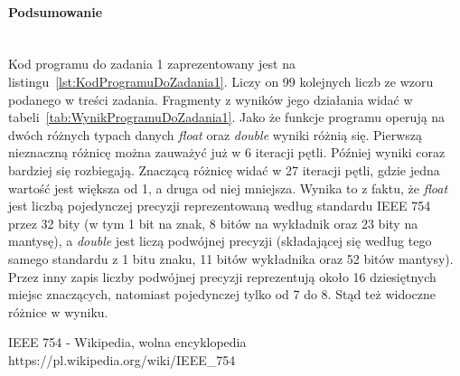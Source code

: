 \paragraph{Podsumowanie}~\\
Kod programu do zadania 1 zaprezentowany jest na listingu~\ref{lst:KodProgramuDoZadania1}.
Liczy on 99 kolejnych liczb ze wzoru podanego w treści zadania.
Fragmenty z wyników jego działania widać w tabeli~\ref{tab:WynikProgramuDoZadania1}.
Jako że funkcje programu operują na dwóch różnych typach danych \textit{float} oraz \textit{double} wyniki różnią się.
Pierwszą nieznaczną różnicę można zauważyć już w 6 iteracji pętli.
Później wyniki coraz bardziej się rozbiegają.
Znaczącą różnicę widać w 27 iteracji pętli, gdzie jedna wartość jest większa od 1, a druga od niej mniejsza.
Wynika to z faktu, że \textit{float} jest liczbą pojedynczej precyzji reprezentowaną według standardu IEEE 754~\cite{WikiIEEE754} przez 32 bity (w tym 1 bit na znak, 8 bitów na wykładnik oraz 23 bity na mantysę), a \textit{double} jest liczą podwójnej precyzji (składającej się według tego samego standardu z 1 bitu znaku, 11 bitów wykładnika oraz 52 bitów mantysy).
Przez inny zapis liczby podwójnej precyzji reprezentują około 16 dziesiętnych miejsc znaczących, natomiast pojedynczej tylko od 7 do 8.
Stąd też widoczne różnice w wyniku.

\begin{thebibliography}{9}
   IEEE 754 - Wikipedia, wolna encyklopedia https://pl.wikipedia.org/wiki/IEEE\_754
\end{thebibliography}

